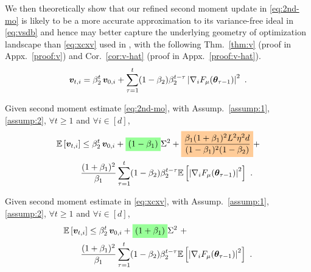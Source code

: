 We then theoretically show that our refined second moment update in \eqref{eq:2nd-mo} is likely to be a more accurate approximation to its variance-free ideal in \eqref{eq:vsdb} and hence may better capture the underlying geometry of optimization landscape than \eqref{eq:xcxv} used in \base{}, with the following Thm.~\ref{thm:v} (proof in Appx.~\ref{proof:v}) and Cor.~\ref{cor:v-hat} (proof in Appx.~\ref{proof:v-hat}).
\begin{equation}\label{eq:vsdb}
{\bm{v}}_{t,i} = \beta_2^t\,{\bm{v}}_{0,i} + \sum_{\tau=1}^{t}(1-\beta_2)\beta_2^{t-\tau}\left|\nabla_i F_{\mu}({\bm{\theta}}_{\tau-1})\right|^2 \ .
\end{equation}
\begin{theorem}\label{thm:v}
Given second moment estimate \eqref{eq:2nd-mo}, with Assump.~\ref{assump:1}, \ref{assump:2}, $\forall{t}\geq1$ and $\forall{i}\in[d]$, 
\begin{equation}\label{eq:sv}
\begin{aligned}
&\E\left[ \vv_{t,i}\right] \leq \beta_2^t\,\vv_{0,i} + \coloredbox{green}{(1-\beta_1)}\Sigma^2 + \coloredbox{orange}{\frac{\beta_1(1+\beta_1)^2L^2\eta^2 d}{(1 - \beta_1)^2(1 - \beta_2)}} + \\
&\qquad\ \ \, \frac{(1+\beta_1)^2}{\beta_1}\sum_{\tau=1}^{t}(1-\beta_2)\beta_2^{t-\tau}\E\left[\left|\nabla_i F_{\mu}(\vtheta_{\tau-1})\right|^2\right] \ .
\end{aligned}
\end{equation}
\end{theorem}
\begin{corollary}\label{cor:v-hat}
Given second moment estimate in \eqref{eq:xcxv}, with Assump.~\ref{assump:1}, \ref{assump:2}, $\forall{t}\geq1$ and $\forall{i}\in[d]$,
\begin{equation}\label{eq:csvg}
\begin{aligned}
&\E\left[ \vv_{t,i}\right] \leq \beta_2^t\,\vv_{0,i} + \coloredbox{green}{(1+\beta_1)}\Sigma^2 \  +  \\
&\qquad \frac{(1+\beta_1)^2}{\beta_1}\sum_{\tau=1}^{t}(1-\beta_2)\beta_2^{t-\tau}\E\left[\left|\nabla_i F_{\mu}(\vtheta_{\tau-1})\right|^2\right] \ .
\end{aligned}
\end{equation}
\end{corollary}
